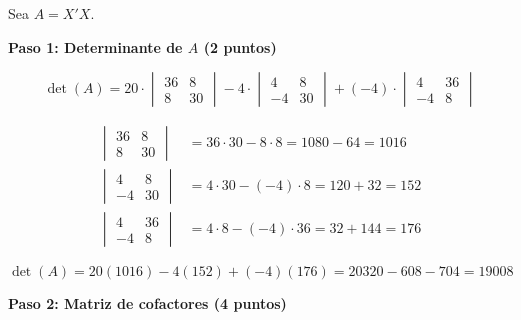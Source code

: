 \documentclass[10pt,a4paper]{article}
\begin{document}
\begin{enumerate}
{\begin{enumerate}
Sea $A = X'X$.

\vspace{0.3cm}
\textbf{Paso 1: Determinante de $A$ (2 puntos)}

$$\det(A) = 20 \cdot \begin{vmatrix} 36 & 8 \\ 8 & 30 \end{vmatrix}
- 4 \cdot \begin{vmatrix} 4 & 8 \\ -4 & 30 \end{vmatrix}
+ (-4) \cdot \begin{vmatrix} 4 & 36 \\ -4 & 8 \end{vmatrix}$$

\begin{align*}
\begin{vmatrix} 36 & 8 \\ 8 & 30 \end{vmatrix} &= 36 \cdot 30 - 8 \cdot 8 = 1080 - 64 = 1016 \\
\begin{vmatrix} 4 & 8 \\ -4 & 30 \end{vmatrix} &= 4 \cdot 30 - (-4) \cdot 8 = 120 + 32 = 152 \\
\begin{vmatrix} 4 & 36 \\ -4 & 8 \end{vmatrix} &= 4 \cdot 8 - (-4) \cdot 36 = 32 + 144 = 176
\end{align*}

$$\det(A) = 20(1016) - 4(152) + (-4)(176) = 20320 - 608 - 704 = \boxed{19008}$$

\vspace{0.3cm}
\textbf{Paso 2: Matriz de cofactores (4 puntos)}


\end{enumerate}}
\end{enumerate}
\end{document}
